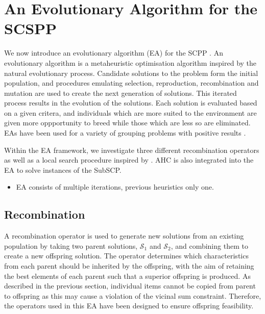 \documentclass[authoryear]{elsarticle}
\begin{document}
\section{An Evolutionary Algorithm for the SCSPP}
\label{sec:ea}
\noindent We now introduce an evolutionary algorithm (EA) for the SCPP . An evolutionary algorithm is a metaheuristic optimisation algorithm inspired by the natural evolutionary process. Candidate solutions to the problem form the initial population, and procedures emulating selection, reproduction, recombination and mutation are used to create the next generation of solutions. This iterated process results in the evolution of the solutions. Each solution is evaluated based on a given critera, and individuals which are more suited to the environment are given more oppportunity to breed while those which are less so are eliminated. EAs have been used for a variety of grouping problems with positive results \citep{lewis2017, falkenauer1996, quiroz2015}. 

Within the EA framework, we investigate three different recombination operators as well as a local search procedure inspired by \citet{martello1990l}. AHC is also integrated into the EA to solve instances of the SubSCP.

{\color{myRed}
\begin{itemize}[leftmargin=*]
	\item EA consists of multiple iterations, previous heuristics only one.
\end{itemize}
}

\subsection{Recombination}
\label{sub:xover}
\noindent A recombination operator is used to generate new solutions from an existing population by taking two parent solutions, $\mathcal{S}_1$ and $\mathcal{S}_2$, and combining them to create a new offspring solution. The operator determines which characteristics from each parent should be inherited by the offspring, with the aim of retaining the best elements of each parent such that a superior offspring is produced. As described in the previous section, individual items cannot be copied from parent to offspring as this may cause a violation of the vicinal sum constraint. Therefore, the operators used in this EA have been designed to ensure offspring feasibility.
\end{document}
